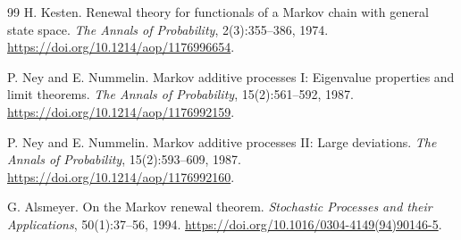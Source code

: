 \documentclass[11pt]{article}
\theoremstyle{definition}
\begin{document}
\begin{thebibliography}{99}
H. Kesten.
\newblock Renewal theory for functionals of a Markov chain with general
state space.
\newblock \emph{The Annals of Probability}, 2(3):355--386, 1974.
\newblock \url{https://doi.org/10.1214/aop/1176996654}.

P. Ney and E. Nummelin.
\newblock Markov additive processes I: Eigenvalue properties and limit
theorems.
\newblock \emph{The Annals of Probability}, 15(2):561--592, 1987.
\newblock \url{https://doi.org/10.1214/aop/1176992159}.

P. Ney and E. Nummelin.
\newblock Markov additive processes II: Large deviations.
\newblock \emph{The Annals of Probability}, 15(2):593--609, 1987.
\newblock \url{https://doi.org/10.1214/aop/1176992160}.

G. Alsmeyer.
\newblock On the Markov renewal theorem.
\newblock \emph{Stochastic Processes and their Applications}, 50(1):37--56,
1994.
\newblock \url{https://doi.org/10.1016/0304-4149(94)90146-5}.

\end{thebibliography}
\end{document}
